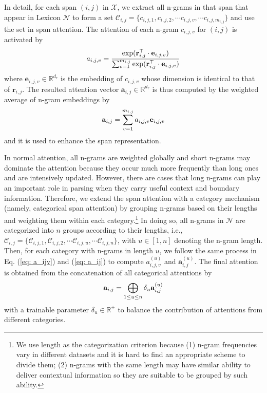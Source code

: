 \documentclass[11pt,a4paper]{article}
\begin{document}
 

In detail, for each span $(i,j)$ in $\mathcal{X}$, we extract all n-grams in that span that appear in Lexicon $\mathcal{N}$ to form a set $\mathcal{C}_{i,j} = \{c_{i,j,1}, c_{i,j,2}, \cdots c_{i,j,v}, \cdots c_{i,j, m_{i,j}}\}$ and use the set in span attention.
The attention of each n-gram $c_{i,j,v}$ for $(i,j)$ is activated by
\begin{equation} \label{eq: a_ijv}
\setlength\abovedisplayskip{5pt}
\setlength\belowdisplayskip{5pt}
    a_{i,j,v} = \frac{\exp(\mathbf{r}_{i,j}^{\top} \cdot \mathbf{e}_{i,j,v})}
                    {\sum_{v=1}^{m_{i,j}} \exp(\mathbf{r}_{i,j}^{\top} \cdot \mathbf{e}_{i,j,v})}
\end{equation}
where $\mathbf{e}_{i,j,v} \in \mathbb{R}^{d_{r}}$ is the embedding of $c_{i,j,v}$ whose dimension is identical to that of $\mathbf{r}_{i,j}$.
The resulted attention vector $\mathbf{a}_{i,j} \in \mathbb{R}^{d_{r}}$ is thus computed by the weighted average of n-gram embeddings by
\begin{equation}
\label{eq: a_ij}
\setlength\abovedisplayskip{5pt}
\setlength\belowdisplayskip{5pt}
\mathbf{a}_{i,j} = \sum_{v=1}^{m_{i,j}} a_{i,j,v} \mathbf{e}_{i,j,v}
\end{equation}
and it is used to enhance the span representation.


In normal attention, all n-grams are weighted globally and short n-grams may dominate the attention because they occur much more frequently than long ones and are intensively updated.
However, there are cases that long n-grams can play an important role in parsing when they carry useful context and boundary information.
Therefore, we extend the span attention with a category mechanism (namely, categorical span attention) by grouping n-grams based on their lengths and weighting them within each category.\footnote{We use length as the categorization criterion because (1) n-gram frequencies vary in different datasets and it is hard to find an appropriate scheme to divide them;
(2) n-grams with the same length may have similar ability to deliver contextual information so they are suitable to be grouped by such ability.}
In doing so, all n-grams in $\mathcal{N}$ are categorized into $n$ groups according to their lengths, i.e., $\mathcal{C}_{i,j}=\{\mathcal{C}_{i,j,1}, \mathcal{C}_{i,j,2}, \cdots \mathcal{C}_{i,j,u}, \cdots \mathcal{C}_{i,j,n}\}$, with $u \in [1, n]$ denoting the n-gram length.
Then, for each category with n-grams in length $u$, we follow 
the same process in Eq. (\ref{eq: a_ijv}) and (\ref{eq: a_ij}) to compute $a^{(u)}_{i,j,v}$ and $\mathbf{a}^{(u)}_{i,j}$.
The final attention is obtained from the concatenation of all categorical attentions by
\begin{equation}
\label{eq: a_iju}
\setlength\abovedisplayskip{5pt}
\setlength\belowdisplayskip{5pt}
\mathbf{a}_{i,j} = \bigoplus_{1\leq u\leq n} \delta_{u} \mathbf{a}^{(u)}_{i,j} 
\end{equation}
with a trainable parameter $\delta_{u} \in \mathbb{R}^{+}$ to balance the contribution of attentions from different categories.
\end{document}
